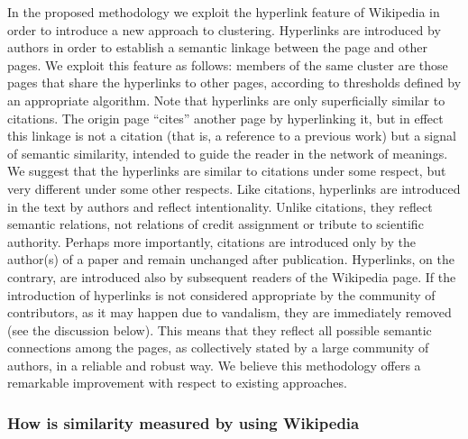\documentclass[]{book}
\theoremstyle{definition}
\theoremstyle{definition}
\theoremstyle{definition}
\theoremstyle{remark}
\begin{document}
In the proposed methodology we exploit the hyperlink feature of
Wikipedia in order to introduce a new approach to clustering. Hyperlinks
are introduced by authors in order to establish a semantic linkage
between the page and other pages. We exploit this feature as follows:
members of the same cluster are those pages that share the hyperlinks to
other pages, according to thresholds defined by an appropriate
algorithm. Note that hyperlinks are only superficially similar to
citations. The origin page ``cites'' another page by hyperlinking it,
but in effect this linkage is not a citation (that is, a reference to a
previous work) but a signal of semantic similarity, intended to guide
the reader in the network of meanings. We suggest that the hyperlinks
are similar to citations under some respect, but very different under
some other respects. Like citations, hyperlinks are introduced in the
text by authors and reflect intentionality. Unlike citations, they
reflect semantic relations, not relations of credit assignment or
tribute to scientific authority. Perhaps more importantly, citations are
introduced only by the author(s) of a paper and remain unchanged after
publication. Hyperlinks, on the contrary, are introduced also by
subsequent readers of the Wikipedia page. If the introduction of
hyperlinks is not considered appropriate by the community of
contributors, as it may happen due to vandalism, they are immediately
removed (see the discussion below). This means that they reflect all
possible semantic connections among the pages, as collectively stated by
a large community of authors, in a reliable and robust way. We believe
this methodology offers a remarkable improvement with respect to
existing approaches.

\subsubsection*{How is similarity measured by using
Wikipedia}\label{how-is-similarity-measured-by-using-wikipedia}
\end{document}
